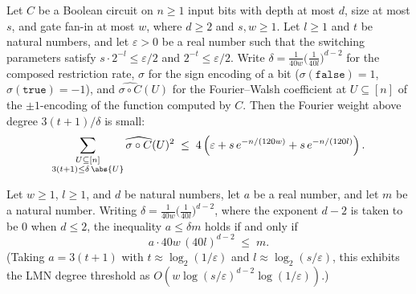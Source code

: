 \begin{theorem}
\label{RestrictionFourier.circuit_fourier_concentration}
\leanok
{}
Let $C$ be a Boolean circuit on $n \ge 1$ input bits with depth at most $d$, size at
most $s$, and gate fan-in at most $w$, where $d \ge 2$ and $s, w \ge 1$. Let $l \ge 1$
and $t$ be natural numbers, and let $\varepsilon > 0$ be a real number such that the
switching parameters satisfy $s \cdot 2^{-l} \le \varepsilon/2$ and
$2^{-t} \le \varepsilon/2$. Write
$\delta = \frac{1}{40w}\bigl(\frac{1}{40l}\bigr)^{d-2}$ for the composed restriction
rate, $\sigma$ for the sign encoding of a bit ($\sigma(\mathtt{false}) = 1$,
$\sigma(\mathtt{true}) = -1$), and $\widehat{\sigma \circ C}(U)$ for the Fourier--Walsh
coefficient at $U \subseteq [n]$ of the $\pm1$-encoding of the function computed by $C$.
Then the Fourier weight above degree $3(t+1)/\delta$ is small:
\[
  \sum_{\substack{U \subseteq [n] \\ 3(t+1) \le \delta\,\abs{U}}}
    \widehat{\sigma \circ C}(U)^2
  \;\le\;
  4\left(\varepsilon + s\,e^{-n/(120 w)} + s\,e^{-n/(120 l)}\right).
\]
\end{theorem}

\begin{lemma}
\label{RestrictionFourier.composedDelta_mul_card_iff}
\leanok
{}
Let $w \ge 1$, $l \ge 1$, and $d$ be natural numbers, let $a$ be a real number, and let
$m$ be a natural number. Writing
$\delta = \frac{1}{40w}\bigl(\frac{1}{40l}\bigr)^{d-2}$, where the exponent $d-2$ is
taken to be $0$ when $d \le 2$, the inequality $a \le \delta m$ holds if and only if
\[
  a \cdot 40 w \, (40 l)^{d-2} \;\le\; m.
\]
(Taking $a = 3(t+1)$ with $t \approx \log_2(1/\varepsilon)$ and
$l \approx \log_2(s/\varepsilon)$, this exhibits the LMN degree threshold as
$O\!\left(w \log(s/\varepsilon)^{d-2} \log(1/\varepsilon)\right)$.)
\end{lemma}

